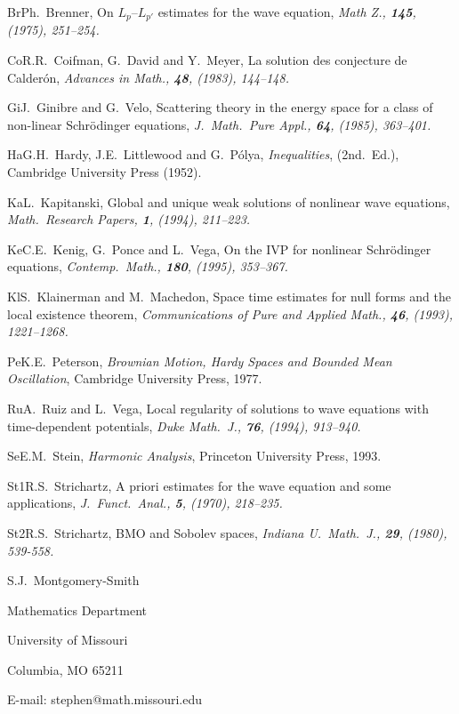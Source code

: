 \item{Br}Ph.~Brenner, On $L_p$--$L_{p'}$ estimates for the wave equation,
{\sl Math Z., {\bf 145}, (1975), 251--254.}
\item{Co}R.R.~Coifman, G.~David and Y.~Meyer, La solution des conjecture
de Calder\'on,
{\sl Advances in Math., {\bf 48}, (1983), 144--148.}
\item{Gi}J.~Ginibre and G.~Velo, Scattering theory in the energy space
for a class of non-linear Schr\"odinger equations, {\sl J.\ Math.\
Pure Appl., {\bf 64}, (1985), 363--401.}
\item{Ha}G.H.~Hardy, J.E.~Littlewood and G.~P\'olya, {\sl Inequalities},
(2nd.\ Ed.),
Cambridge University Press (1952).
\item{Ka}L.~Kapitanski, Global and unique weak solutions of nonlinear
wave equations, {\sl Math.\ Research Papers, {\bf 1}, (1994), 211--223.}
\item{Ke}C.E.~Kenig, G.~Ponce and L.~Vega, On the IVP for nonlinear
Schr\"odinger equations, {\sl Contemp.\ Math., {\bf 180}, (1995), 353--367.}
\item{Kl}S.~Klainerman and M.~Machedon, Space time estimates for null
forms and the local existence theorem,
{\sl Communications of Pure and Applied Math., {\bf 46}, (1993), 1221--1268.}
\item{Pe}K.E.~Peterson, {\sl Brownian Motion, Hardy Spaces and Bounded
Mean Oscillation}, Cambridge University Press, 1977.
\item{Ru}A.~Ruiz and L.~Vega, Local regularity of solutions to wave
equations with time-dependent potentials, {\sl Duke Math.\ J., {\bf 76},
(1994), 913--940.}
\item{Se}E.M.~Stein, {\sl Harmonic Analysis}, Princeton University Press,
1993.
\item{St1}R.S.~Strichartz, A priori estimates for the wave equation and some 
applications, {\sl J.\ Funct.\ Anal., {\bf 5}, (1970), 218--235.}
\item{St2}R.S.~Strichartz, BMO and Sobolev spaces,
{\sl Indiana U.\ Math.\ J., {\bf 29}, (1980), 539-558.}

\bigskip

S.J.~Montgomery-Smith

Mathematics Department

University of Missouri

Columbia, MO 65211

E-mail: stephen@math.missouri.edu

\bye


